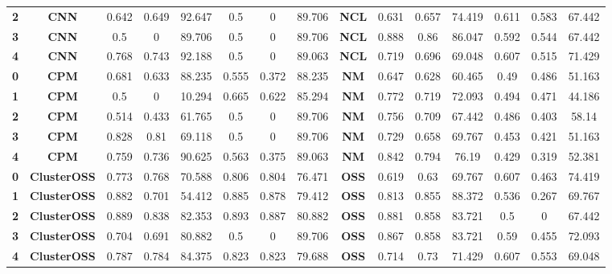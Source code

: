 {{\begin{tabular}{c|c|cccccc|ccccccc}
\textbf{2} & \textbf{CNN} & 0.642 & 0.649 & 92.647 & 0.5   & 0     & 89.706 & \multicolumn{1}{c|}{\textbf{NCL}} & 0.631 & 0.657 & 74.419 & 0.611 & 0.583 & 67.442 \\
\textbf{3} & \textbf{CNN} & 0.5   & 0     & 89.706 & 0.5   & 0     & 89.706 & \multicolumn{1}{c|}{\textbf{NCL}} & 0.888 & 0.86  & 86.047 & 0.592 & 0.544 & 67.442 \\
\textbf{4} & \textbf{CNN} & 0.768 & 0.743 & 92.188 & 0.5   & 0     & 89.063 & \multicolumn{1}{c|}{\textbf{NCL}} & 0.719 & 0.696 & 69.048 & 0.607 & 0.515 & 71.429 \\
\textbf{0} & \textbf{CPM} & 0.681 & 0.633 & 88.235 & 0.555 & 0.372 & 88.235 & \multicolumn{1}{c|}{\textbf{NM}} & 0.647 & 0.628 & 60.465 & 0.49  & 0.486 & 51.163 \\
\textbf{1} & \textbf{CPM} & 0.5   & 0     & 10.294 & 0.665 & 0.622 & 85.294 & \multicolumn{1}{c|}{\textbf{NM}} & 0.772 & 0.719 & 72.093 & 0.494 & 0.471 & 44.186 \\
\textbf{2} & \textbf{CPM} & 0.514 & 0.433 & 61.765 & 0.5   & 0     & 89.706 & \multicolumn{1}{c|}{\textbf{NM}} & 0.756 & 0.709 & 67.442 & 0.486 & 0.403 & 58.14 \\
\textbf{3} & \textbf{CPM} & 0.828 & 0.81  & 69.118 & 0.5   & 0     & 89.706 & \multicolumn{1}{c|}{\textbf{NM}} & 0.729 & 0.658 & 69.767 & 0.453 & 0.421 & 51.163 \\
\textbf{4} & \textbf{CPM} & 0.759 & 0.736 & 90.625 & 0.563 & 0.375 & 89.063 & \multicolumn{1}{c|}{\textbf{NM}} & 0.842 & 0.794 & 76.19 & 0.429 & 0.319 & 52.381 \\
\textbf{0} & \textbf{ClusterOSS} & 0.773 & 0.768 & 70.588 & 0.806 & 0.804 & 76.471 & \multicolumn{1}{c|}{\textbf{OSS}} & 0.619 & 0.63  & 69.767 & 0.607 & 0.463 & 74.419 \\
\textbf{1} & \textbf{ClusterOSS} & 0.882 & 0.701 & 54.412 & 0.885 & 0.878 & 79.412 & \multicolumn{1}{c|}{\textbf{OSS}} & 0.813 & 0.855 & 88.372 & 0.536 & 0.267 & 69.767 \\
\textbf{2} & \textbf{ClusterOSS} & 0.889 & 0.838 & 82.353 & 0.893 & 0.887 & 80.882 & \multicolumn{1}{c|}{\textbf{OSS}} & 0.881 & 0.858 & 83.721 & 0.5   & 0     & 67.442 \\
\textbf{3} & \textbf{ClusterOSS} & 0.704 & 0.691 & 80.882 & 0.5   & 0     & 89.706 & \multicolumn{1}{c|}{\textbf{OSS}} & 0.867 & 0.858 & 83.721 & 0.59  & 0.455 & 72.093 \\
\textbf{4} & \textbf{ClusterOSS} & 0.787 & 0.784 & 84.375 & 0.823 & 0.823 & 79.688 & \multicolumn{1}{c|}{\textbf{OSS}} & 0.714 & 0.73  & 71.429 & 0.607 & 0.553 & 69.048 \\

\end{tabular}}}
